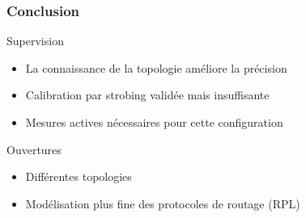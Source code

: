 \begin{frame}\frametitle{Conclusion}

  \begin{block}{Supervision}
      \begin{itemize}
        \item La connaissance de la topologie améliore la précision
        \item Calibration par strobing validée mais insuffisante
        \item Mesures actives nécessaires pour cette configuration
      \end{itemize}
  \end{block}

  \begin{block}{Ouvertures}
    \begin{itemize}
      \item Différentes topologies
      \item Modélisation plus fine des protocoles de routage (RPL)
    \end{itemize}
  \end{block}


\end{frame}
